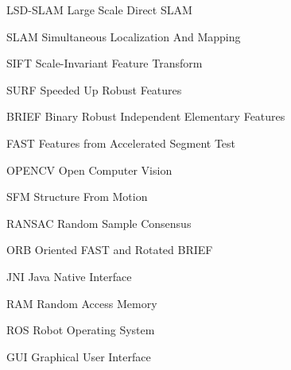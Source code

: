 
\begin{siglas}
\item[LSD-SLAM]Large Scale Direct SLAM
\item[SLAM]Simultaneous Localization And Mapping
\item[SIFT]Scale-Invariant Feature Transform
\item[SURF]Speeded Up Robust Features
\item[BRIEF]Binary Robust Independent Elementary Features
\item[FAST]Features from Accelerated Segment Test
\item[OPENCV]Open Computer Vision
\item[SFM]Structure From Motion
\item[RANSAC]Random Sample Consensus
\item[ORB]Oriented FAST and Rotated BRIEF
\item[JNI]Java Native Interface
\item[RAM]Random Access Memory
\item[ROS]Robot Operating System
\item[GUI]Graphical User Interface

\end{siglas}
